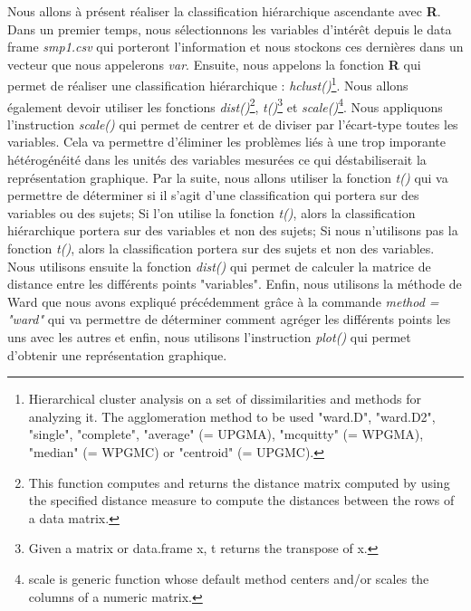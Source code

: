 Nous allons à présent réaliser la classification hiérarchique ascendante avec \textbf{R}.\newline
Dans un premier temps, nous sélectionnons les variables d'intérêt depuis le data frame \textit{smp1.csv} qui porteront l'information et nous stockons ces dernières dans un vecteur que nous appelerons \textit{var}. \newline
Ensuite, nous appelons la fonction \textbf{R} qui permet de réaliser une classification hiérarchique : \textit{hclust()}\footnote{Hierarchical cluster analysis on a set of dissimilarities and methods for analyzing it. The agglomeration method to be used "ward.D", "ward.D2", "single", "complete", "average" (= UPGMA), "mcquitty" (= WPGMA), "median" (= WPGMC) or "centroid" (= UPGMC).}. Nous allons également devoir utiliser les fonctions \textit{dist()}\footnote{This function computes and returns the distance matrix computed by using the specified distance measure to compute the distances between the rows of a data matrix.}, \textit{t()}\footnote{Given a matrix or data.frame x, t returns the transpose of x.} et \textit{scale()}\footnote{scale is generic function whose default method centers and/or scales the columns of a numeric matrix.}.\newline
Nous appliquons l'instruction \textit{scale()} qui permet de centrer et de diviser par l'écart-type toutes les variables. Cela va permettre d'éliminer les problèmes liés à une trop imporante hétérogénéité dans les unités des variables mesurées ce qui déstabiliserait la représentation graphique.\newline
Par la suite, nous allons utiliser la fonction \textit{t()} qui va permettre de déterminer si il s'agit d'une classification qui portera sur des variables ou des sujets; Si l'on utilise la fonction \textit{t()}, alors la classification hiérarchique portera sur des variables et non des sujets; Si nous n'utilisons pas la fonction \textit{t()}, alors la classification portera sur des sujets et non des variables.\newline
Nous utilisons ensuite la fonction \textit{dist()} qui permet de calculer la matrice de distance entre les différents points "variables".\newline
Enfin, nous utilisons la méthode de Ward que nous avons expliqué précédemment grâce à la commande \textit{method = "ward"} qui va permettre de déterminer comment agréger les différents points les uns avec les autres et enfin, nous utilisons l'instruction \textit{plot()} qui permet d'obtenir une représentation graphique.\newline


